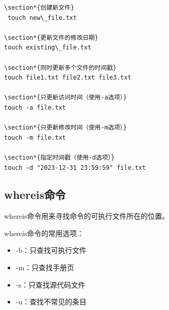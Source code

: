 \documentclass[12pt,UTF8]{ctexbook}
\begin{document}
\begin{verbatim}
\section*{创建新文件}
 touch new\_file.txt

\section*{更新文件的修改日期}
touch existing\_file.txt

\section*{同时更新多个文件的时间戳}
touch file1.txt file2.txt file3.txt

\section*{只更新访问时间（使用-a选项）}
touch -a file.txt

\section*{只更新修改时间（使用-m选项）}
touch -m file.txt

\section*{指定时间戳（使用-d选项）}
touch -d "2023-12-31 23:59:59" file.txt
\end{verbatim}

\subsection{whereis命令}
whereis命令用来寻找命令的可执行文件所在的位置。

whereis命令的常用选项：
\begin{itemize}
    \item -b：只查找可执行文件
    \item -m：只查找手册页
    \item -s：只查找源代码文件
    \item -u：查找不常见的条目
\end{itemize}
\end{document}
